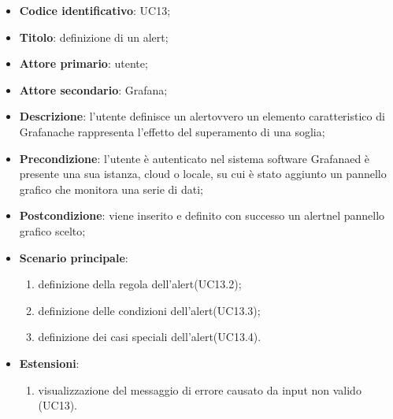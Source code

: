 \begin{itemize}
	\item \textbf{Codice identificativo}: UC13;
	\item \textbf{Titolo}: definizione di un alert\glo;
	\item \textbf{Attore primario}: utente;
	\item \textbf{Attore secondario}: Grafana\glo;
	\item \textbf{Descrizione}: l'utente definisce un alert\glosp ovvero un elemento caratteristico di Grafana\glosp che rappresenta l'effetto del superamento di una soglia;
	\item \textbf{Precondizione}: l'utente è autenticato nel sistema software Grafana\glosp ed è presente una sua istanza, cloud o locale, su cui è stato aggiunto un pannello grafico che monitora una serie di dati;
	\item \textbf{Postcondizione}: viene inserito e definito con successo un alert\glosp nel pannello grafico scelto;
	\item \textbf{Scenario principale}: 
	\begin{enumerate}
		\item definizione della regola dell'alert\glosp (UC13.2);
		\item definizione delle condizioni dell'alert\glosp (UC13.3);
		\item definizione dei casi speciali dell'alert\glosp (UC13.4).
	\end{enumerate}
	\item \textbf{Estensioni}:	
	\begin{enumerate}
		\item visualizzazione del messaggio di errore causato da input non valido (UC13).
	\end{enumerate}
\end{itemize}


